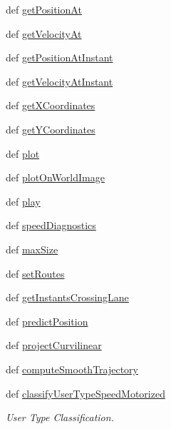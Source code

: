 \begin{DoxyCompactItemize}
def \hyperlink{classmoving_1_1MovingObject_ae47df2470c9fec917703400b5c962952}{get\-Position\-At}
\item 
def \hyperlink{classmoving_1_1MovingObject_a758f733dad0f9bf008cf45b89fe6063d}{get\-Velocity\-At}
\item 
def \hyperlink{classmoving_1_1MovingObject_a211e344ff77101e62a622013eadc71e4}{get\-Position\-At\-Instant}
\item 
def \hyperlink{classmoving_1_1MovingObject_a50f2867c8b6ba48f995739b0514233a9}{get\-Velocity\-At\-Instant}
\item 
def \hyperlink{classmoving_1_1MovingObject_aa343196bdaa82a5f77ebbfc27e44bc82}{get\-X\-Coordinates}
\item 
def \hyperlink{classmoving_1_1MovingObject_aba0e610ae2c0a8a205dadc9050fabc5d}{get\-Y\-Coordinates}
\item 
def \hyperlink{classmoving_1_1MovingObject_ac3f01327779af30047cc5157bb888978}{plot}
\item 
def \hyperlink{classmoving_1_1MovingObject_abadedb1af95d3b454c9bd93ceaeaa01c}{plot\-On\-World\-Image}
\item 
def \hyperlink{classmoving_1_1MovingObject_a64fd36dc48667b8210cc4c1a99a07338}{play}
\item 
def \hyperlink{classmoving_1_1MovingObject_aaf2dbfc97c3369654635449de3a14292}{speed\-Diagnostics}
\item 
def \hyperlink{classmoving_1_1MovingObject_a421d11edb5a6aca8cecacec5281c6989}{max\-Size}
\item 
def \hyperlink{classmoving_1_1MovingObject_a2fe41fc0d9a175e20490bd99ac400156}{set\-Routes}
\item 
def \hyperlink{classmoving_1_1MovingObject_ac58512c182f4c68fe27d5c959e9746b6}{get\-Instants\-Crossing\-Lane}
\item 
def \hyperlink{classmoving_1_1MovingObject_a4c784dd1df16736aaa6d0704e909adea}{predict\-Position}
\item 
def \hyperlink{classmoving_1_1MovingObject_afc87c0f8de37eb8d2802c331dad960ef}{project\-Curvilinear}
\item 
def \hyperlink{classmoving_1_1MovingObject_ad1de451e8476a36fd8fa83ba478f1906}{compute\-Smooth\-Trajectory}
\item 
def \hyperlink{classmoving_1_1MovingObject_af57a779bf124e557d2ebc522326e7d48}{classify\-User\-Type\-Speed\-Motorized}
\begin{DoxyCompactList}\small\item\em User Type Classification. \end{DoxyCompactList}\item 

\end{DoxyCompactItemize}
